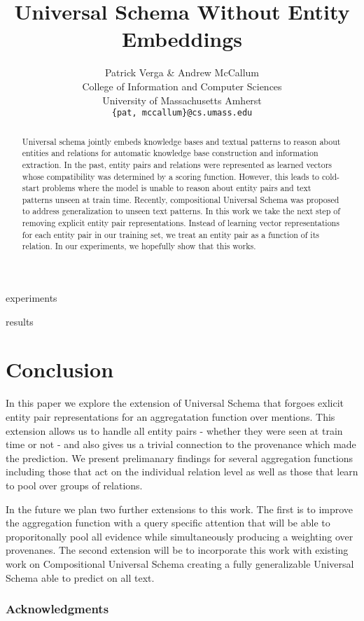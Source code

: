 \documentclass{article} %
\title{Universal Schema Without Entity Embeddings}
\author{Patrick Verga \& Andrew McCallum \\
    College of Information and Computer Sciences\\
    University of Massachusetts Amherst\\
    \texttt{\{pat, mccallum\}@cs.umass.edu} \\
}
\begin{document}
\maketitle

\begin{abstract}
Universal schema jointly embeds knowledge bases and textual patterns to reason about entities and relations for automatic knowledge base construction and information extraction. In the past, entity pairs and relations were represented as learned vectors whose compatibility was determined by a scoring function. However, this leads to cold-start problems where the model is unable to reason about entity pairs and text patterns unseen at train time. Recently, compositional Universal Schema was proposed to address generalization to unseen text patterns. In this work we take the next step of removing explicit entity pair representations. Instead of learning vector representations for each entity pair in our training set, we treat an entity pair as a function of its relation. In our experiments, we hopefully show that this works.
\end{abstract}







 {experiments}

 {results}

\section{Conclusion}
In this paper we explore the extension of Universal Schema that forgoes exlicit entity pair representations for an aggregatation function over mentions.
This extension allows us to handle all entity pairs - whether they were seen at train time or not - and also gives us a trivial connection to the provenance which made the prediction.
We present prelimanary findings for several aggregation functions including those that act on the individual relation level as well as those that learn to pool over groups of relations.

In the future we plan two further extensions to this work.
The first is to improve the aggregation function with a query specific attention that will be able to proporitonally pool all evidence while simultaneously producing a weighting over provenanes.
The second extension will be to incorporate this work with existing work on Compositional Universal Schema creating a fully generalizable Universal Schema able to predict on all text.


\subsubsection*{Acknowledgments}




\newpage
%
\end{document}
